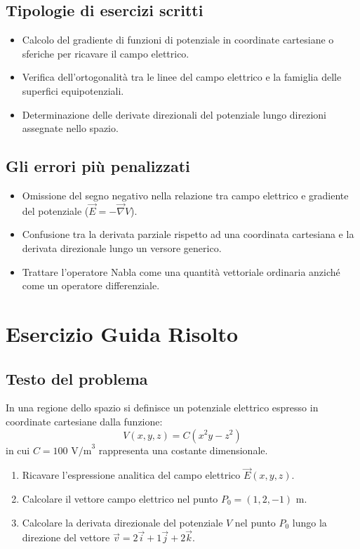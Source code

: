 \documentclass[12pt, a4paper]{article}
\begin{document}
\subsection{Tipologie di esercizi scritti}
\begin{itemize}
    \item Calcolo del gradiente di funzioni di potenziale in coordinate cartesiane o sferiche per ricavare il campo elettrico.
    \item Verifica dell'ortogonalità tra le linee del campo elettrico e la famiglia delle superfici equipotenziali.
    \item Determinazione delle derivate direzionali del potenziale lungo direzioni assegnate nello spazio.
\end{itemize}

\subsection{Gli errori più penalizzati}
\begin{itemize}
    \item Omissione del segno negativo nella relazione tra campo elettrico e gradiente del potenziale ($\vec{E} = -\vec{\nabla}V$).
    \item Confusione tra la derivata parziale rispetto ad una coordinata cartesiana e la derivata direzionale lungo un versore generico.
    \item Trattare l'operatore Nabla come una quantità vettoriale ordinaria anziché come un operatore differenziale.
\end{itemize}

\section{Esercizio Guida Risolto}

\subsection{Testo del problema}
In una regione dello spazio si definisce un potenziale elettrico espresso in coordinate cartesiane dalla funzione:
\[
V(x, y, z) = C (x^2 y - z^2)
\]
in cui $C = 100 \text{ V/m}^3$ rappresenta una costante dimensionale.
\begin{enumerate}
    \item Ricavare l'espressione analitica del campo elettrico $\vec{E}(x, y, z)$.
    \item Calcolare il vettore campo elettrico nel punto $P_0 = (1, 2, -1) \text{ m}$.
    \item Calcolare la derivata direzionale del potenziale $V$ nel punto $P_0$ lungo la direzione del vettore $\vec{v} = 2\vec{i} + 1\vec{j} + 2\vec{k}$.
\end{enumerate}
\end{document}
